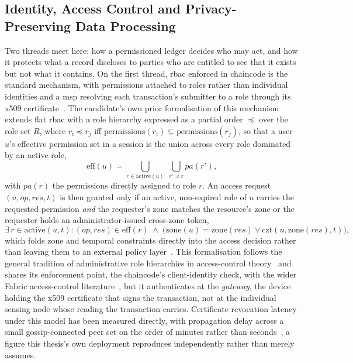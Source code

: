 \documentclass[12pt,a4paper,oneside]{book}
\begin{document}
\subsection{Identity, Access Control and Privacy-Preserving Data Processing}
\label{subsec:lit_privacy}

Two threads meet here: how a permissioned ledger decides who may act, and
how it protects what a record discloses to parties who are entitled to see
that it exists but not what it contains. On the first thread, \gls{rbac}
enforced in chaincode is the standard mechanism, with permissions attached
to roles rather than individual identities and a \gls{msp} resolving each
transaction's submitter to a role through its
\gls{x509} certificate~\cite{mdpiAccessControl, hyperledger2022msp}. The
candidate's own prior formalisation of this
mechanism~\cite{beloasone2025hrbac} extends flat \gls{rbac} with a role
hierarchy expressed as a partial order $\preceq$ over the role set $R$,
where $r_i \preceq r_j$ iff $\mathrm{permissions}(r_i) \subseteq
\mathrm{permissions}(r_j)$, so that a user $u$'s effective permission set
in a session is the union across every role dominated by an active role,
\begin{equation}
\mathrm{eff}(u) = \bigcup_{r \in \mathrm{active}(u)} \; \bigcup_{r' \preceq r} pa(r'),
\label{eq:hrbac_eff}
\end{equation}
with $pa(r)$ the permissions directly assigned to role $r$. An access
request $(u, op, res, t)$ is then granted only if an active, non-expired
role of $u$ carries the requested permission \emph{and} the requester's
zone matches the resource's zone or the requester holds an
administrator-issued cross-zone token,
\begin{equation}
\exists\, r \in \mathrm{active}(u,t) : (op,res) \in \mathrm{eff}(r)
\;\land\; \bigl(\mathrm{zone}(u) = \mathrm{zone}(res) \lor
\mathrm{czt}(u,\mathrm{zone}(res),t)\bigr),
\label{eq:hrbac_grant}
\end{equation}
which folds zone and temporal constraints directly into the access
decision rather than leaving them to an external policy
layer~\cite{beloasone2025hrbac}. This formalisation follows the general
tradition of administrative role hierarchies in access-control
theory~\cite{lu2022revocation} and shares its enforcement point, the
chaincode's client-identity check, with the wider Fabric access-control
literature~\cite{mdpiAccessControl}, but it authenticates at the
\emph{gateway}, the device holding the \gls{x509} certificate that signs
the transaction, not at the individual sensing node whose reading the
transaction carries. Certificate revocation latency under this model has
been measured directly, with propagation delay across a small
gossip-connected peer set on the order of minutes rather than
seconds~\cite{lu2022revocation}, a figure this thesis's own deployment
reproduces independently rather than merely assumes.
\end{document}
